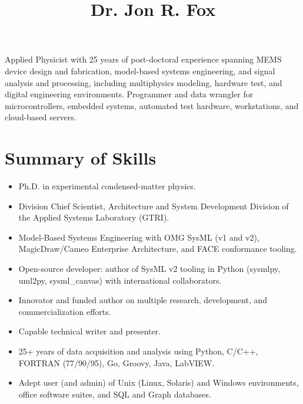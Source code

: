 \documentclass[american]{cv}
\begin{document}



\title{Dr. Jon R. Fox}

\maketitle
Applied Physicist with 25 years of post-doctoral experience spanning MEMS
device design and fabrication, model-based systems engineering, and signal
analysis and processing, including multiphysics modeling, hardware test, and
digital engineering environments. Programmer and data wrangler for
microcontrollers, embedded systems, automated test hardware, workstations,
and cloud-based servers. 

\section{Summary of Skills}

\begin{itemize}

    \item Ph.D. in experimental condensed-matter physics.
    \item Division Chief Scientist, Architecture and System Development Division of the Applied Systems Laboratory (GTRI). 
    \item Model-Based Systems Engineering with OMG SysML (v1 and v2), MagicDraw/Cameo Enterprise Architecture, and FACE conformance tooling.
    \item Open-source developer: author of SysML v2 tooling in Python (sysmlpy, uml2py, sysml\_canvas) with international collaborators.
    \item Innovator and funded author on multiple research, development, and commercialization efforts.
    \item Capable technical writer and presenter.
    \item 25+ years of data acquisition and analysis using Python, C/C++, FORTRAN (77/90/95), Go, Groovy, Java, LabVIEW.
    \item Adept user (and admin) of Unix (Linux, Solaris) and Windows environments, office software suites, and SQL and Graph databases.

\end{itemize}
\end{document}
